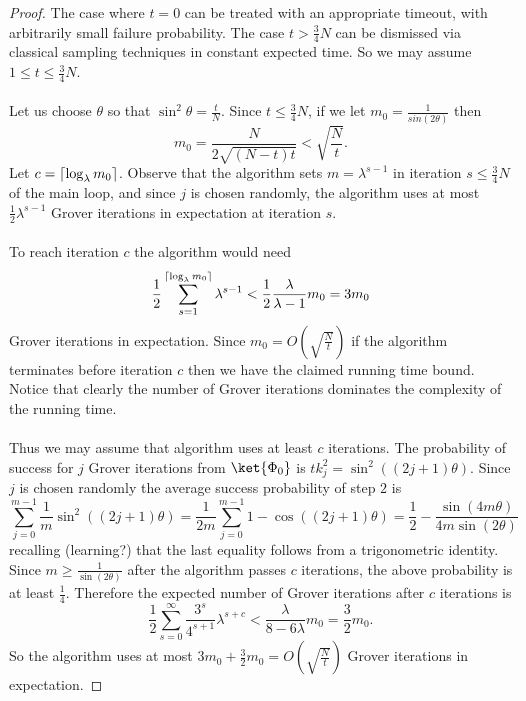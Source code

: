 \begin{proof}
The case where $t=0$ can be treated with an appropriate timeout, with arbitrarily small failure probability. The case $t > \frac{3}{4}N$ can be dismissed via classical sampling techniques in constant expected time. So we may assume $1\leq t\leq \frac{3}{4}N$.
\paragraph{}
Let us choose $\theta$ so that $\sin^2\theta = \frac{t}{N}$. Since $t\leq \frac{3}{4}N$, if we let $m_0 = \frac{1}{sin(2\theta)}$ then
$$m_0 = \frac{N}{2\sqrt{(N-t)t}} < \sqrt{\frac{N}{t}}.$$
Let $c = \left\lceil\log_\lambda m_0\right\rceil$. Observe that the algorithm sets $m =\lambda^{s-1}$ in iteration $s \leq \frac{3}{4}N$ of the main loop, and since $j$ is chosen randomly, the algorithm uses at most $\frac{1}{2} \lambda^{s-1}$ Grover iterations in expectation at iteration $s$. 
\paragraph{}
To reach iteration $c$ the algorithm would need
$$\frac{1}{2}\sum_{s=1}^{\left\lceil\log_\lambda m_0\right\rceil} \lambda^{s-1} <\frac{1}{2}\frac{\lambda}{\lambda - 1} m_0 = 3m_0$$
Grover iterations in expectation. Since $m_0 = O(\sqrt{\frac{N}{t}})$ if the algorithm terminates before iteration $c$ then we have the claimed running time bound. Notice that clearly the number of Grover iterations dominates the complexity of the running time.
\paragraph{}
Thus we may assume that algorithm uses at least $c$ iterations. The probability of success for $j$ Grover iterations from $\ket{\Phi_0}$ is $tk_j^2= \sin^2((2j+1)\theta)$. Since $j$ is chosen randomly the average success probability of step $2$ is
$$\sum_{j=0}^{m-1}\frac{1}{m}\sin^2((2j+1)\theta) = \frac{1}{2m}\sum_{j=0}^{m-1}1 - \cos((2j+1)\theta) = \frac{1}{2} - \frac{\sin(4m\theta)}{4m\sin(2\theta)}$$
recalling (learning?) that the last equality follows from a trigonometric identity. Since $m \geq \frac{1}{\sin(2\theta)}$ after the algorithm passes $c$ iterations, the above probability is at least $\frac{1}{4}$. Therefore the expected number of Grover iterations after $c$ iterations is
$$ \frac{1}{2}\sum_{s=0}^\infty \frac{3^s}{4^{s+1}}\lambda^{s+c} < \frac{\lambda}{8-6\lambda}m_0 = \frac{3}{2} m_0. $$
So the algorithm uses at most $3m_0 + \frac{3}{2}m_0 = O(\sqrt{\frac{N}{t}})$ Grover iterations in expectation.
\end{proof}
